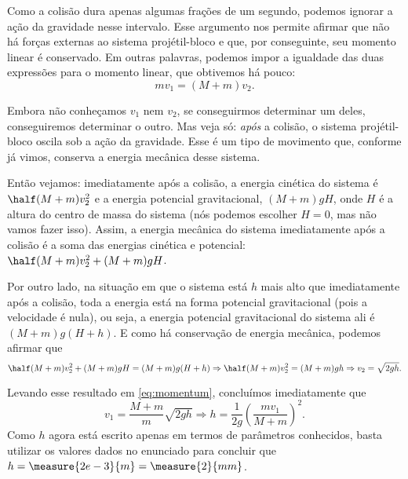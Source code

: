 \begin{question}
\begin{solution}
		Como a colisão dura apenas algumas frações de um segundo, podemos ignorar a ação da gravidade nesse intervalo.
		Esse argumento nos permite afirmar que não há forças externas ao sistema projétil-bloco e que, por conseguinte, seu momento linear é conservado.
		Em outras palavras, podemos impor a igualdade das duas expressões para o momento linear, que obtivemos há pouco:
		\begin{equation}\label{eq:momentum}
			mv_1 = (M + m)v_2.
		\end{equation}

		Embora não conheçamos $v_1$ nem $v_2$, se conseguirmos determinar um deles, conseguiremos determinar o outro.
		Mas veja só: \emph{após} a colisão, o sistema projétil-bloco oscila sob a ação da gravidade.
		Esse é um tipo de movimento que, conforme já vimos, conserva a energia mecânica desse sistema.

		Então vejamos: imediatamente após a colisão, a energia cinética do sistema é $\half (M+m)v_2^2$ e a energia potencial gravitacional, $(M+m)gH$, onde $H$ é a altura do centro de massa do sistema (nós podemos escolher $H = 0$, mas não vamos fazer isso).
		Assim, a energia mecânica do sistema imediatamente após a colisão é a soma das energias cinética e potencial: $\half (M + m) v_2^2 + (M + m) g H$.

		Por outro lado, na situação em que o sistema está $h$ mais alto que imediatamente após a colisão, toda a energia está na forma potencial gravitacional (pois a velocidade é nula), ou seja, a energia potencial gravitacional do sistema ali é $(M+m)g(H+h)$.
		E como há conservação de energia mecânica, podemos afirmar que
		\begin{equation*}
			\half (M + m) v_2^2 + (M + m) g H = (M+m)g(H+h)
				\Rightarrow
			\half (M + m) v_2^2 = (M+m)gh
				\Rightarrow
			v_2 = \sqrt{2gh}.
		\end{equation*}

		Levando esse resultado em \eqref{eq:momentum}, concluímos imediatamente que
		\begin{equation*}
			v_1 = \frac{M+m}{m}\sqrt{2gh}
				\Rightarrow
			h = \frac{1}{2g}\left(\frac{mv_1}{M + m}\right)^2.
		\end{equation*}
		Como $h$ agora está escrito apenas em termos de parâmetros conhecidos, basta utilizar os valores dados no enunciado para concluir que $h = \measure{2e-3}{m} = \measure{2}{mm}$.
	\end{solution}
\end{question}